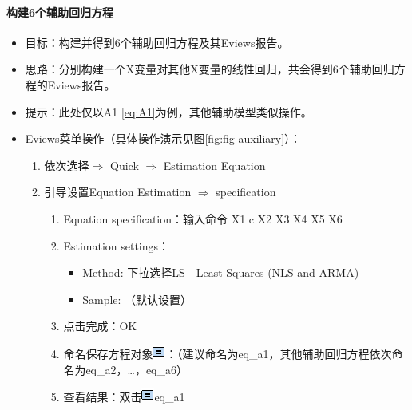 \documentclass[12pt,(landscape,a4paper),(portrait,a4paper)]{article}
\providecommand{\tightlist}{%
  \setlength{\itemsep}{0pt}\setlength{\parskip}{0pt}}
\let\oldparagraph\paragraph
\renewcommand{\paragraph}[1]{\oldparagraph{#1}\mbox{}}
\begin{document}
\hypertarget{6}{%
\paragraph{构建6个辅助回归方程}\label{6}}

\begin{itemize}
\tightlist
\item
  目标：构建并得到6个辅助回归方程及其Eviews报告。
\item
  思路：分别构建一个X变量对其他X变量的线性回归，共会得到6个辅助回归方程的Eviews报告。
\item
  提示：此处仅以A1 \eqref{eq:A1}为例，其他辅助模型类似操作。
\item
  Eviews菜单操作（具体操作演示见图\ref{fig:fig-auxiliary}）：

  \begin{enumerate}
  \def\labelenumi{\arabic{enumi})}
  \tightlist
  \item
    依次选择\(\Rightarrow\) Quick \(\Rightarrow\) Estimation Equation\\
  \item
    引导设置Equation Estimation \(\Rightarrow\) specification

    \begin{enumerate}
    \def\labelenumii{\alph{enumii}.}
    \tightlist
    \item
      Equation specification：输入命令 X1 c X2 X3 X4 X5 X6
    \item
      Estimation settings：

      \begin{itemize}
      \tightlist
      \item
        Method: 下拉选择LS - Least Squares (NLS and ARMA)
      \item
        Sample: （默认设置）
      \end{itemize}
    \item
      点击完成：OK
    \item
      命名保存方程对象\includegraphics{picture/object/Equation.png}：（建议命名为eq\_a1，其他辅助回归方程依次命名为eq\_a2，\ldots{}，eq\_a6）
    \item
      查看结果：双击\includegraphics{picture/object/Equation.png}eq\_a1
    \end{enumerate}
  \end{enumerate}
\end{itemize}
\end{document}
